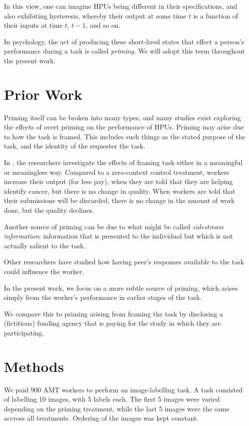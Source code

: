 \documentclass[letterpaper, 11pt, twocolumn]{article}
\begin{document}
In this view, one can imagine HPUs being different in their specifications,
and also exhibiting hysteresis, whereby their output at some time $t$ is a
function of their inputs at time $t$, $t-1$, and so on.

In psychology, the act of producing these short-lived states that effect a
person's performance during a task is called \textit{priming}.  We will adopt
this term throughout the present work.


\section*{Prior Work}
Priming itself can be broken into many types, and many studies exist exploring
the effects of overt priming on the performance of HPUs. Priming may arise
due to how the task is framed.  This includes such things as the stated
purpose of the task, and the identity of the requester the task.

In \cite{chandler2013breaking}, the researchers investigate the effects of 
framing task either in a meaningful or meaningless way.  Compared to a 
zero-context control treatment, workers increase their output (for less pay),
when they are told that they are helping identify cancer, but there is no
change in quality.  When workers are told that their submissions will be 
discarded, there is no change in the amount of work done, but the quality 
declines.

Another source of priming can be due to what might be called 
\textit{sidestream information}: information that is presented to the 
individual but which is not actually salient to the task.

Other researchers have studied how having peer's responses available to 
the task could influence the worker.

In the present work, we focus on a more subtle source of priming, which arises
simply from the worker's performance in earlier stages of the task. 

We compare this to priming arising from framing the task by disclosing a 
(fictitious) funding agency that is paying for the study in which they are 
participating.

\section*{Methods}

We paid 900 AMT workers to perform an image-labelling task.  A task consisted 
of labelling 10 images, with 5 labels each.  The first 5 images were varied 
depending on the priming treatment, while the last 5 images were the same 
accross all treatments.  Ordering of the images was kept constant.
\end{document}
